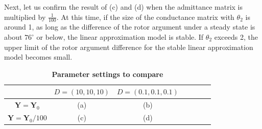 \documentclass[tombow,dvipdfmx]{corona-a5-1.1}
\begin{document}
\begin{例}
Next, let us confirm the result of (c) and (d) when the admittance matrix is multiplied by $\tfrac{1}{100}$.
At this time, if the size of the conductance matrix with $\theta_2$ is around 1, as long as the difference of the rotor argument under a steady state is about $76^\circ$ or below, the linear approximation model is stable.
If $\theta_2$ exceeds 2, the upper limit of the rotor argument difference for the stable linear approximation model becomes small.

\end{例}

\begin{table}[h]
\medskip
 \caption{\textbf{Parameter settings to compare}}
 \label{table:parasetcom}
 \centering
  \begin{tabular}{|c|c|c|c|c|c|c|}
   \hline
 &    $D=(10,10,10)$ &   $D=(0.1,0.1,0.1)$ \\
   \hline 
 $\bm{Y} =\bm{Y}_0$ & (a) & (b) \\
   \hline
 $\bm{Y} = \bm{Y}_0/100  $  & (c) & (d) \\
   \hline
  \end{tabular}
\end{table}
\end{document}
